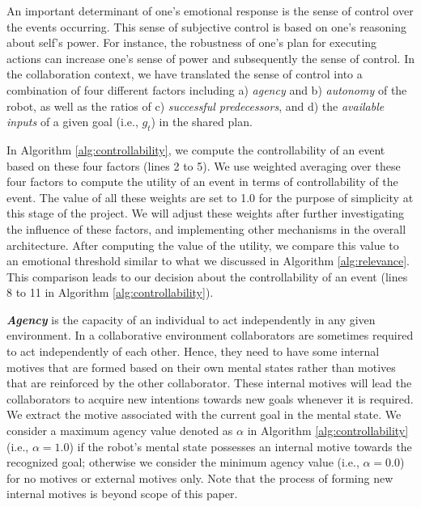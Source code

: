 \documentclass{article}
\begin{document}
An important determinant of one's emotional response is the sense of control
over the events occurring. This sense of subjective control is based on one's
reasoning about self's power. For instance, the robustness of one's plan for
executing actions can increase one's sense of power and subsequently the sense
of control. In the collaboration context, we have translated the sense of control
into a combination of four different factors including a) \textit{agency} and b)
\textit{autonomy} of the robot, as well as the ratios of c) \textit{successful
predecessors}, and d) the \textit{available inputs} of a given goal
(i.e., $\mathit{g}_{t}$) in the shared plan.

In Algorithm \ref{alg:controllability}, we compute the controllability of an
event based on these four factors (lines 2 to 5). We use weighted averaging over
these four factors to compute the utility of an event in terms of
controllability of the event. The value of all these weights are set to 1.0 for
the purpose of simplicity at this stage of the project. We will adjust these
weights after further investigating the influence of these factors, and
implementing other mechanisms in the overall architecture. After computing the
value of the utility, we compare this value to an emotional threshold similar to
what we discussed in Algorithm \ref{alg:relevance}. This comparison leads to our
decision about the controllability of an event (lines 8 to 11 in Algorithm
\ref{alg:controllability}).

\textit{\textbf{Agency}} is the capacity of an individual to act independently
in any given environment. In a collaborative environment collaborators are
sometimes required to act independently of each other. Hence, they need to have
some internal motives that are formed based on their own mental states rather
than motives that are reinforced by the other collaborator. These internal
motives will lead the collaborators to acquire new intentions towards new goals
whenever it is required. We extract the motive associated with the current goal
in the mental state. We consider a maximum agency value denoted as $\alpha$ in
Algorithm \ref{alg:controllability} (i.e., $\alpha=1.0$) if the robot's mental
state possesses an internal motive towards the recognized goal; otherwise we
consider the minimum agency value (i.e., $\alpha=0.0$) for no motives or
external motives only. Note that the process of forming new internal motives is
beyond scope of this paper.
\end{document}
